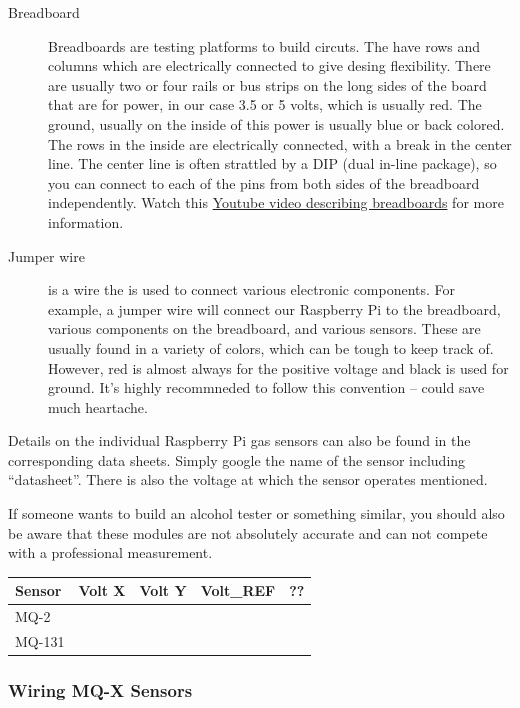 \documentclass{article}\usepackage[]{graphicx}\usepackage[]{color}
\begin{document}
\begin{description}
\item[Breadboard] Breadboards are testing platforms to build circuts. The have rows and columns which are electrically connected to give desing flexibility. There are usually two or four rails or bus strips on the long sides of the board that are for power, in our case 3.5 or 5 volts, which is usually red. The ground, usually on the inside of this power is usually blue or back colored. The rows in the inside are electrically connected, with a break in the center line. The center line is often strattled by a DIP (dual in-line package), so you can connect to each of the pins from both sides of the breadboard independently. Watch this \href{https://www.google.com/search?q=how+to+breadboards+work&rlz=1C1CHBD_enUS834US834&oq=how+to+breadboards+work&aqs=chrome..69i57j0l3.5628j1j7&sourceid=chrome&ie=UTF-8#kpvalbx=_Gz39Xq2-CuTi9APB3JGYCQ52}{Youtube video describing breadboards} for more information. 
\item[Jumper wire] is a wire the is used to connect various electronic components. For example, a jumper wire will connect our Raspberry Pi to the breadboard, various components on the breadboard, and various sensors. These are usually found in a variety of colors, which can be tough to keep track of. However, red is almost always for the positive voltage and black is used for ground. It's highly recommneded to follow this convention -- could save much heartache.

\end{description}

Details on the individual Raspberry Pi gas sensors can also be found in the corresponding data sheets. Simply google the name of the sensor including ``datasheet''. There is also the voltage at which the sensor operates mentioned.

If someone wants to build an alcohol tester or something similar, you should also be aware that these modules are not absolutely accurate and can not compete with a professional measurement.

\begin{table}
\centering
\begin{tabular}{lrrrr}\hline
Sensor & Volt X & Volt Y & Volt\_REF & ?? \\
\hline\hline
MQ-2  & &&& \\
MQ-131 & &&& \\ \hline
\end{tabular}
\end{table}

\subsubsection{Wiring MQ-X Sensors}
\end{document}
